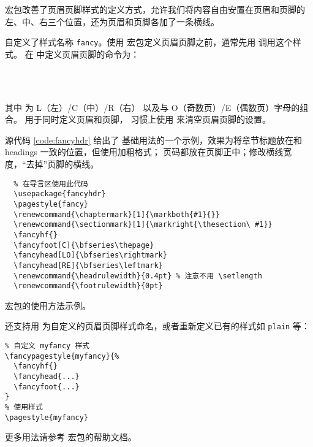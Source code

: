  宏包改善了页眉页脚样式的定义方式，允许我们将内容自由安置在页眉和页脚的左、中、右三个位置，还为页眉和页脚各加了一条横线。

 自定义了样式名称 \texttt{fancy}。使用  宏包定义页眉页脚之前，通常先用  调用这个样式。
在  中定义页眉页脚的命令为：
\begin{command}
\marg*{\ldots}\\
\marg*{\ldots}\\
\marg*{\ldots}
\end{command}
其中  为 L（左）/C（中）/R（右） 以及与 O（奇数页）/E（偶数页）字母的组合。 用于同时定义页眉和页脚，
习惯上使用 \marg*{} 来清空页眉页脚的设置。

源代码 \ref{code:fancyhdr} 给出了  基础用法的一个示例，效果为将章节标题放在和 headings 一致的位置，但使用加粗格式；
页码都放在页脚正中；修改横线宽度，“去掉”页脚的横线。

\begin{sourcecode}[htp]
  \begin{Verbatim}
  % 在导言区使用此代码
  \usepackage{fancyhdr}
  \pagestyle{fancy}
  \renewcommand{\chaptermark}[1]{\markboth{#1}{}}
  \renewcommand{\sectionmark}[1]{\markright{\thesection\ #1}}
  \fancyhf{}
  \fancyfoot[C]{\bfseries\thepage}
  \fancyhead[LO]{\bfseries\rightmark}
  \fancyhead[RE]{\bfseries\leftmark}
  \renewcommand{\headrulewidth}{0.4pt} % 注意不用 \setlength
  \renewcommand{\footrulewidth}{0pt}
  \end{Verbatim}
  \caption{ 宏包的使用方法示例。}\label{code:fancyhdr}
\end{sourcecode}

 还支持用  为自定义的页眉页脚样式命名，或者重新定义已有的样式如 \texttt{plain} 等：
\begin{verbatim}
% 自定义 myfancy 样式
\fancypagestyle{myfancy}{%
  \fancyhf{}
  \fancyhead{...}
  \fancyfoot{...}
}
% 使用样式
\pagestyle{myfancy}
\end{verbatim}

更多用法请参考  宏包的帮助文档。


\endinput
